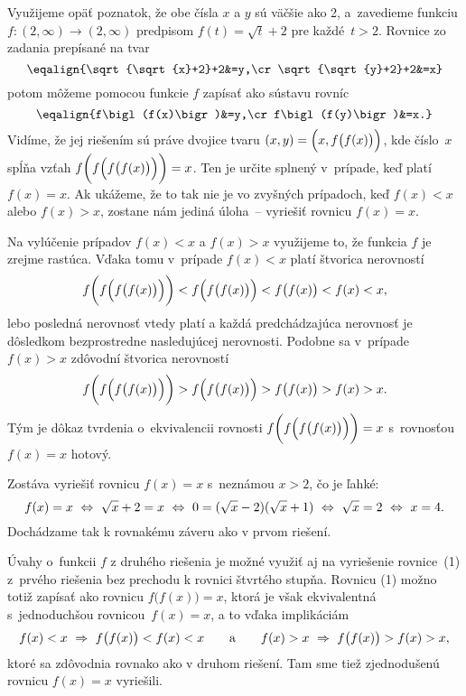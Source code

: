 {\ineriesenie
Využijeme opäť poznatok, že obe čísla $x$ a $y$ sú väčšie ako 2,
a~zavedieme funkciu $f\colon(2,\infty)\to(2,\infty)$ predpisom
$f(t)=\sqrt{t}+2$ pre každé~$t>2$. Rovnice zo zadania prepísané na tvar
$$
\eqalign{\sqrt{\sqrt{x}+2}+2&=y,\cr
\sqrt{\sqrt{y}+2}+2&=x}
$$
potom môžeme pomocou funkcie $f$ zapísať ako sústavu rovníc
$$
\eqalign{f\bigl(f(x)\bigr)&=y,\cr
f\bigl(f(y)\bigr)&=x.}
$$
Vidíme, že jej riešením sú práve dvojice tvaru
$(x, y)=\Bigl(x, f\bigl(f(x)\bigr)\Bigr)$, kde číslo~$x$ spĺňa vzťah $f\biggl(f\Bigl(f\bigl(f (x)\bigr)\Bigr)\biggr)=x$.
Ten je určite splnený v~prípade, keď platí $f(x)=x$. Ak ukážeme, že
to tak nie je vo zvyšných prípadoch, keď $f(x)<x$ alebo $f(x)>x$,
zostane nám jediná úloha~-- vyriešiť rovnicu $f(x)=x$.

Na vylúčenie prípadov $f(x)<x$ a $f(x)>x$ využijeme to, že funkcia
$f$ je zrejme rastúca. Vďaka tomu v~prípade $f(x)<x$ platí
štvorica nerovností
$$
f\biggl(f\Bigl(f\bigl(f(x)\bigr)\Bigr)\biggr)<f\Bigl(f\bigl(f(x)\bigr)\Bigr)<f\bigl(f (x)\bigr)<f(x)<x,
$$
lebo posledná nerovnosť vtedy platí a každá predchádzajúca nerovnosť je
dôsledkom bezprostredne nasledujúcej nerovnosti. Podobne sa
v~prípade $f(x)>x$ zdôvodní štvorica nerovností
$$
f\biggl(f\Bigl(f\bigl(f(x)\bigr)\Bigr)\biggr)>f\Bigl(f\bigl(f(x)\bigr)\Bigr)>f\bigl(f (x)\bigr)>f(x)>x.
$$
Tým je dôkaz tvrdenia o~ekvivalencii rovnosti $f\biggl(f\Bigl(f\bigl(f(x)\bigr)\Bigr)\biggr)=x$
s~rovnosťou $f(x)=x$ hotový.

Zostáva vyriešiť rovnicu $f(x)=x$ s~neznámou $x>2$,
čo je ľahké:
$$\def\ekv{\ \Leftrightarrow\ }
f(x)=x\ekv \sqrt{x}+2=x\ekv 0=(\sqrt{x}-2)(\sqrt{x}+1)\ekv
\sqrt{x}=2\ekv x=4.
$$
Dochádzame tak k rovnakému záveru ako v prvom riešení.

\poznamka
Úvahy o~funkcii $f$ z druhého riešenia je možné využiť aj na vyriešenie
rovnice~(1) z~prvého riešenia bez prechodu k rovnici štvrtého stupňa.
Rovnicu (1) možno totiž zapísať ako rovnicu $f\bigl(f(x)\bigr)=x$,
ktorá je však ekvivalentná s~jednoduchšou rovnicou~$f(x)=x$,
a to vďaka implikáciám
$$
f(x)<x\ \Rightarrow\ f\bigl(f(x)\bigr)<f(x)<x\qquad\hbox{a}\qquad
f(x)>x\ \Rightarrow\ f\bigl(f(x)\bigr)>f(x)>x,
$$
ktoré sa zdôvodnia rovnako ako v druhom riešení. Tam sme tiež
zjednodušenú rovnicu $f(x)=x$ vyriešili.

}
